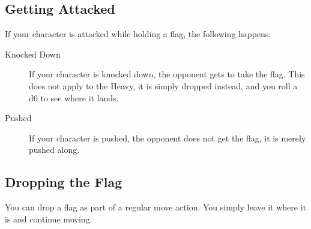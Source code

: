 \subsection{Getting Attacked}
If your character is attacked while holding a flag, the following happens:
\begin{description}
\item[Knocked Down] If your character is knocked down, the opponent gets to take the flag. This does not apply to the Heavy, it is simply dropped instead, and you roll a d6 to see where it lands.
\item[Pushed] If your character is pushed, the opponent does not get the flag, it is merely pushed along.
\end{description}

\subsection{Dropping the Flag}
You can drop a flag as part of a regular move action. You simply leave it where it is and continue moving.